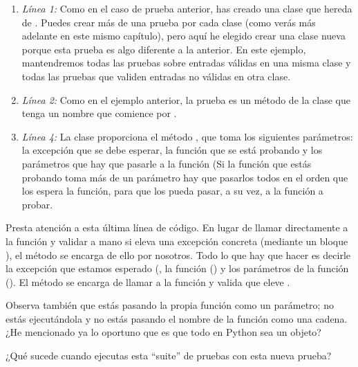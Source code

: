 \begin{enumerate}

\item \emph{Línea 1:} Como en el caso de prueba anterior, has creado una clase que hereda de . Puedes crear más de una prueba por cada clase (como verás más adelante en este mismo capítulo), pero aquí he elegido crear una clase nueva porque esta prueba es algo diferente a la anterior. En este ejemplo, mantendremos todas las pruebas sobre entradas válidas en una misma clase y todas las pruebas que validen entradas no válidas en otra clase.

\item \emph{Línea 2:} Como en el ejemplo anterior, la prueba es un método de la clase que tenga un nombre que comience por .

\item \emph{Línea 4:} La clase  proporciona el método , que toma los siguientes parámetros: la excepción que se debe esperar, la función que se está probando y los parámetros que hay que pasarle a la función (Si la función que estás probando toma más de un parámetro hay que pasarlos todos  en el orden que los espera la función, para que  los pueda pasar, a su vez, a la función a probar.

\end{enumerate}

Presta atención a esta última línea de código. En lugar de llamar directamente a la función  y validar a mano si eleva una excepción concreta (mediante un bloque ), el método  se encarga de ello por nosotros. Todo lo que hay que hacer es decirle la excepción que estamos esperado (, la función () y los parámetros de la función (). El método  se encarga de llamar a la función  y valida que eleve .

Observa también que estás pasando la propia función  como un parámetro; no estás ejecutándola y no estás pasando el nombre de la función como una cadena. ¿He mencionado ya lo oportuno que es que todo en Python sea un objeto?

¿Qué sucede cuando ejecutas esta ``suite'' de pruebas con esta nueva prueba?


